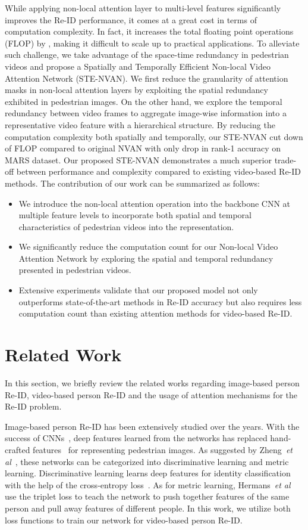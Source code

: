 \documentclass{bmvc2k}
\def\etal{\emph{et al}\bmvaOneDot}
\begin{document}
While applying non-local attention layer to multi-level features significantly improves the Re-ID performance, it comes at a great cost in terms of computation complexity.
In fact, it increases the total floating point operations (FLOP) by , making it difficult to scale up to practical applications.
To alleviate such challenge, we take advantage of the space-time redundancy in pedestrian videos and propose a Spatially and Temporally Efficient Non-local Video Attention Network (STE-NVAN).
We first reduce the granularity of attention masks in non-local attention layers by exploiting the spatial redundancy exhibited in pedestrian images.
On the other hand, we explore the temporal redundancy between video frames to aggregate image-wise information into a representative video feature with a hierarchical structure.
By reducing the computation complexity both spatially and temporally, our STE-NVAN cut down  of FLOP compared to original NVAN with only  drop in rank-1 accuracy on MARS dataset.
Our proposed STE-NVAN demonstrates a much superior trade-off between performance and complexity compared to existing video-based Re-ID methods.
The contribution of our work can be summarized as follows:
\begin{itemize}[noitemsep]
\item We introduce the non-local attention operation into the backbone CNN at multiple feature levels to incorporate both spatial and temporal characteristics of pedestrian videos into the representation.
\item We significantly reduce the computation count for our Non-local Video Attention Network by exploring the spatial and temporal redundancy presented in pedestrian videos.
\item Extensive experiments validate that our proposed model not only outperforms state-of-the-art methods in Re-ID accuracy but also requires less computation count than existing attention methods for video-based Re-ID.
\end{itemize} \section{Related Work}

In this section, we briefly review the related works regarding image-based person Re-ID, video-based person Re-ID and the usage of attention mechanisms for the Re-ID problem.

Image-based person Re-ID has been extensively studied over the years. 
With the success of CNNs~\cite{domaindrop,svdnet,IDE,trip,HACNN}, deep features learned from the networks has replaced hand-crafted features~\cite{viper,market,caviar,lomo} for representing pedestrian images.
As suggested by Zheng~\etal~\cite{ppp}, these networks can be categorized into discriminative learning and metric learning.
Discriminative learning learns deep features for identity classification with the help of the cross-entropy loss~\cite{domaindrop,svdnet,IDE}.
As for metric learning, Hermans~\etal~\cite{trip} use the triplet loss to teach the network to push together features of the same person and pull away features of different people.
In this work, we utilize both loss functions to train our network for video-based person Re-ID.
\end{document}

